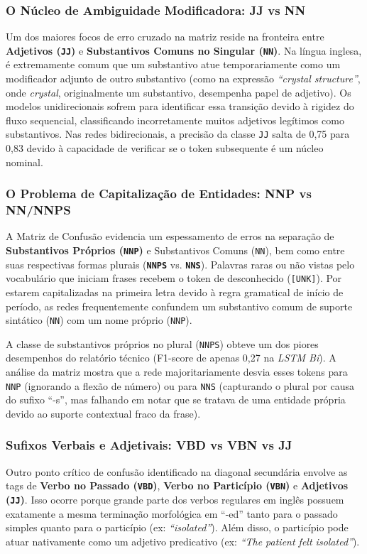 \documentclass[a4paper,12pt]{article}
\begin{document}
\subsubsection*{O Núcleo de Ambiguidade Modificadora: JJ vs NN}
Um dos maiores focos de erro cruzado na matriz reside na fronteira entre \textbf{Adjetivos (\texttt{JJ})} e \textbf{Substantivos Comuns no Singular (\texttt{NN})}. Na língua inglesa, é extremamente comum que um substantivo atue temporariamente como um modificador adjunto de outro substantivo (como na expressão \textit{``crystal structure''}, onde \textit{crystal}, originalmente um substantivo, desempenha papel de adjetivo). 
Os modelos unidirecionais sofrem para identificar essa transição devido à rigidez do fluxo sequencial, classificando incorretamente muitos adjetivos legítimos como substantivos. Nas redes bidirecionais, a precisão da classe \texttt{JJ} salta de 0,75 para 0,83 devido à capacidade de verificar se o token subsequente é um núcleo nominal.

\subsubsection*{O Problema de Capitalização de Entidades: NNP vs NN/NNPS}
A Matriz de Confusão evidencia um espessamento de erros na separação de \textbf{Substantivos Próprios (\texttt{NNP})} e Substantivos Comuns (\texttt{NN}), bem como entre suas respectivas formas plurais (\textbf{\texttt{NNPS}} vs. \textbf{\texttt{NNS}}). 
Palavras raras ou não vistas pelo vocabulário que iniciam frases recebem o token de desconhecido (\texttt{[UNK]}). Por estarem capitalizadas na primeira letra devido à regra gramatical de início de período, as redes frequentemente confundem um substantivo comum de suporte sintático (\texttt{NN}) com um nome próprio (\texttt{NNP}). 

A classe de substantivos próprios no plural (\texttt{NNPS}) obteve um dos piores desempenhos do relatório técnico (F1-score de apenas 0,27 na \textit{LSTM Bi}). A análise da matriz mostra que a rede majoritariamente desvia esses tokens para \texttt{NNP} (ignorando a flexão de número) ou para \texttt{NNS} (capturando o plural por causa do sufixo ``-s'', mas falhando em notar que se tratava de uma entidade própria devido ao suporte contextual fraco da frase).

\subsubsection*{Sufixos Verbais e Adjetivais: VBD vs VBN vs JJ}
Outro ponto crítico de confusão identificado na diagonal secundária envolve as tags de \textbf{Verbo no Passado (\texttt{VBD})}, \textbf{Verbo no Particípio (\texttt{VBN})} e \textbf{Adjetivos (\texttt{JJ})}. 
Isso ocorre porque grande parte dos verbos regulares em inglês possuem exatamente a mesma terminação morfológica em ``-ed'' tanto para o passado simples quanto para o particípio (ex: \textit{``isolated''}). Além disso, o particípio pode atuar nativamente como um adjetivo predicativo (ex: \textit{``The patient felt isolated''}). 
\end{document}
